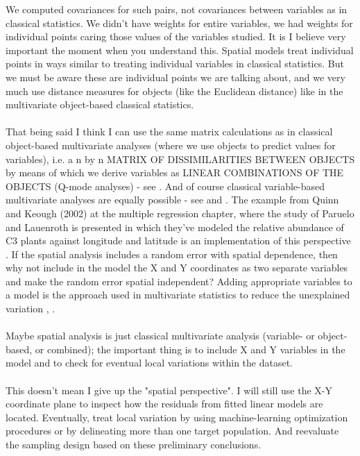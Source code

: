 \documentclass {article}
\begin{document}
We computed covariances for such pairs, not covariances between variables as in classical statistics. We didn't have weights for entire variables, we had weights for individual points caring those values of the variables studied. 
It is I believe very important the moment when you understand this. Spatial models treat individual points in ways similar to treating individual variables in classical statistics. But we must be aware these are individual points we are talking about, and we very much use distance measures for objects (like the Euclidean distance) like in the multivariate object-based classical statistics.
\\
\\
That being said I think I can use the same matrix calculations as in classical object-based multivariate analyses (where we use objects to predict values for variables), i.e. a n by n MATRIX OF DISSIMILARITIES BETWEEN OBJECTS by means of which we derive variables as LINEAR COMBINATIONS OF THE OBJECTS (Q-mode analyses) - see \cite{quinn_experimental_2002}.  
And of course classical variable-based multivariate analyses are equally possible - see \cite{quinn_experimental_2002} and \cite{carroll_mathematical_1997}. 
The example from Quinn and Keough (2002) at the multiple regression chapter, where the study of Paruelo and Lauenroth is presented in which they've modeled the relative abundance of C3 plants against longitude and latitude is an implementation of this perspective \cite{paruelo_relative_1996}.
 If the spatial analysis includes a random error with spatial dependence, then why not include in the model the X and Y coordinates as two separate variables and make the random error spatial independent? Adding appropriate variables to a model is the approach used in multivariate statistics to reduce the unexplained variation \cite{quinn_experimental_2002} , \cite{carroll_mathematical_1997}.
\\
\\
Maybe spatial analysis is just classical multivariate analysis (variable- or object-based, or combined); the important thing is to include X and Y variables in the model and to check for eventual local variations within the dataset.
\\
\\
This doesn't mean I give up the "spatial perspective". I will still use the X-Y coordinate plane to inspect how the residuals from fitted linear models are located. Eventually, treat local variation by using machine-learning optimization procedures or by delineating more than one target population. And reevaluate the sampling design based on these preliminary conclusions.
\end{document}

